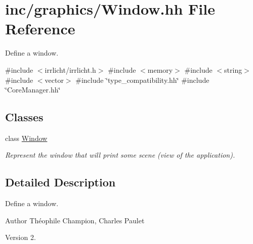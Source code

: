 \hypertarget{Window_8hh}{}\section{inc/graphics/\+Window.hh File Reference}
\label{Window_8hh}


Define a window.  


{\ttfamily \#include $<$irrlicht/irrlicht.\+h$>$}\newline
{\ttfamily \#include $<$memory$>$}\newline
{\ttfamily \#include $<$string$>$}\newline
{\ttfamily \#include $<$vector$>$}\newline
{\ttfamily \#include \char`\"{}type\+\_\+compatibility.\+hh\char`\"{}}\newline
{\ttfamily \#include \char`\"{}Core\+Manager.\+hh\char`\"{}}\newline
\subsection*{Classes}
\begin{DoxyCompactItemize}
\item 
class \hyperlink{classWindow}{Window}
\begin{DoxyCompactList}\small\item\em Represent the window that will print some scene (view of the application). \end{DoxyCompactList}\end{DoxyCompactItemize}


\subsection{Detailed Description}
Define a window. 

\begin{DoxyAuthor}{Author}
Théophile Champion, Charles Paulet 
\end{DoxyAuthor}
\begin{DoxyVersion}{Version}
2. 
\end{DoxyVersion}
